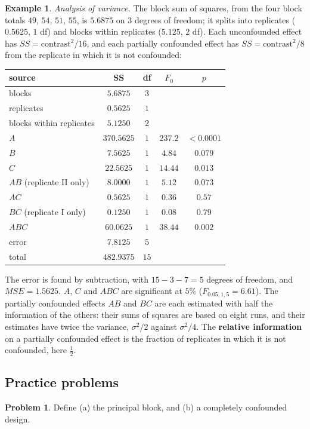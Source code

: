 \documentclass[11pt,a4paper]{article}
\numberwithin{equation}{section}
\theoremstyle{definition}
\newtheorem{exa}[thm]{Example}
\newtheorem{problemx}{Problem}[subsection]
\newenvironment{problem}{\begin{problemx}}{\end{problemx}}
\begin{document}
\begin{exa}
\emph{Analysis of variance.} The block sum of squares, from the four block totals $49$, $54$, $51$, $55$, is $5.6875$ on $3$ degrees of freedom; it splits into
replicates ($0.5625$, $1$ df) and blocks within replicates ($5.125$, $2$ df). Each unconfounded effect has $SS = \text{contrast}^2/16$, and each partially confounded
effect has $SS = \text{contrast}^2/8$ from the replicate in which it is not confounded:
\begin{center}
\begin{tabular}{l|c|c|c|c}
source & SS & df & $F_0$ & $p$ \\
\hline
blocks & $5.6875$ & $3$ & & \\
\quad replicates & $0.5625$ & $1$ & & \\
\quad blocks within replicates & $5.1250$ & $2$ & & \\
$A$ & $370.5625$ & $1$ & $237.2$ & $< 0.0001$ \\
$B$ & $7.5625$ & $1$ & $4.84$ & $0.079$ \\
$C$ & $22.5625$ & $1$ & $14.44$ & $0.013$ \\
$AB$ (replicate II only) & $8.0000$ & $1$ & $5.12$ & $0.073$ \\
$AC$ & $0.5625$ & $1$ & $0.36$ & $0.57$ \\
$BC$ (replicate I only) & $0.1250$ & $1$ & $0.08$ & $0.79$ \\
$ABC$ & $60.0625$ & $1$ & $38.44$ & $0.002$ \\
error & $7.8125$ & $5$ & & \\
\hline
total & $482.9375$ & $15$ & &
\end{tabular}
\end{center}
The error is found by subtraction, with $15 - 3 - 7 = 5$ degrees of freedom, and $MSE = 1.5625$. $A$, $C$ and $ABC$ are significant at $5\%$ ($F_{0.05,1,5} = 6.61$). The
partially confounded effects $AB$ and $BC$ are each estimated with half the information of the others: their sums of squares are based on eight
runs, and their estimates have twice the variance, $\sigma^2/2$ against $\sigma^2/4$. The \textbf{relative information} on a partially confounded effect is the fraction of
replicates in which it is not confounded, here $\frac12$.
\end{exa}

\subsection{Practice problems}

\begin{problem}
Define (a) the principal block, and (b) a completely confounded design.
\end{problem}
\end{document}
